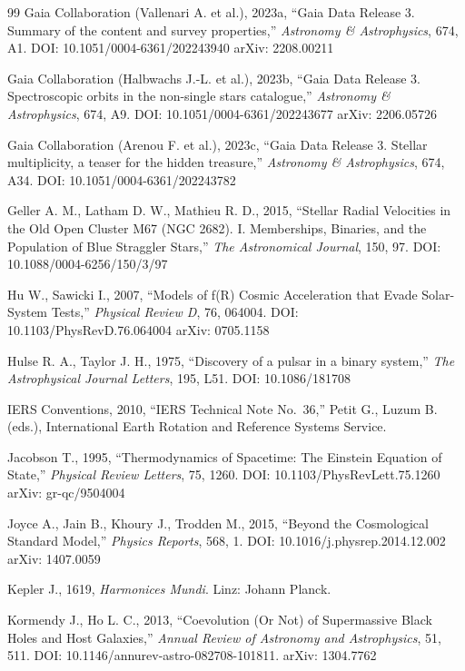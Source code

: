 \documentclass[11pt,a4paper]{article}
\begin{document}
{\begin{thebibliography}{99}
Gaia Collaboration (Vallenari A. et al.), 2023a, ``Gaia Data Release 3. Summary of the content and survey properties,'' \emph{Astronomy \& Astrophysics}, 674, A1. DOI: 10.1051/0004-6361/202243940 arXiv: 2208.00211

Gaia Collaboration (Halbwachs J.-L. et al.), 2023b, ``Gaia Data Release 3. Spectroscopic orbits in the non-single stars catalogue,'' \emph{Astronomy \& Astrophysics}, 674, A9. DOI: 10.1051/0004-6361/202243677 arXiv: 2206.05726

Gaia Collaboration (Arenou F. et al.), 2023c, ``Gaia Data Release 3. Stellar multiplicity, a teaser for the hidden treasure,'' \emph{Astronomy \& Astrophysics}, 674, A34. DOI: 10.1051/0004-6361/202243782

Geller A. M., Latham D. W., Mathieu R. D., 2015, ``Stellar Radial Velocities in the Old Open Cluster M67 (NGC 2682). I. Memberships, Binaries, and the Population of Blue Straggler Stars,'' \emph{The Astronomical Journal}, 150, 97. DOI: 10.1088/0004-6256/150/3/97

Hu W., Sawicki I., 2007, ``Models of f(R) Cosmic Acceleration that Evade Solar-System Tests,'' \emph{Physical Review D}, 76, 064004. DOI: 10.1103/PhysRevD.76.064004 arXiv: 0705.1158

Hulse R. A., Taylor J. H., 1975, ``Discovery of a pulsar in a binary system,'' \emph{The Astrophysical Journal Letters}, 195, L51. DOI: 10.1086/181708

IERS Conventions, 2010, ``IERS Technical Note No.~36,'' Petit G., Luzum B. (eds.), International Earth Rotation and Reference Systems Service.

Jacobson T., 1995, ``Thermodynamics of Spacetime: The Einstein Equation of State,'' \emph{Physical Review Letters}, 75, 1260. DOI: 10.1103/PhysRevLett.75.1260 arXiv: gr-qc/9504004

Joyce A., Jain B., Khoury J., Trodden M., 2015, ``Beyond the Cosmological Standard Model,'' \emph{Physics Reports}, 568, 1. DOI: 10.1016/j.physrep.2014.12.002 arXiv: 1407.0059

Kepler J., 1619, \emph{Harmonices Mundi}. Linz: Johann Planck.

Kormendy J., Ho L. C., 2013, ``Coevolution (Or Not) of Supermassive Black Holes and Host Galaxies,'' \emph{Annual Review of Astronomy and Astrophysics}, 51, 511. DOI: 10.1146/annurev-astro-082708-101811. arXiv: 1304.7762


\end{thebibliography}}
\end{document}
